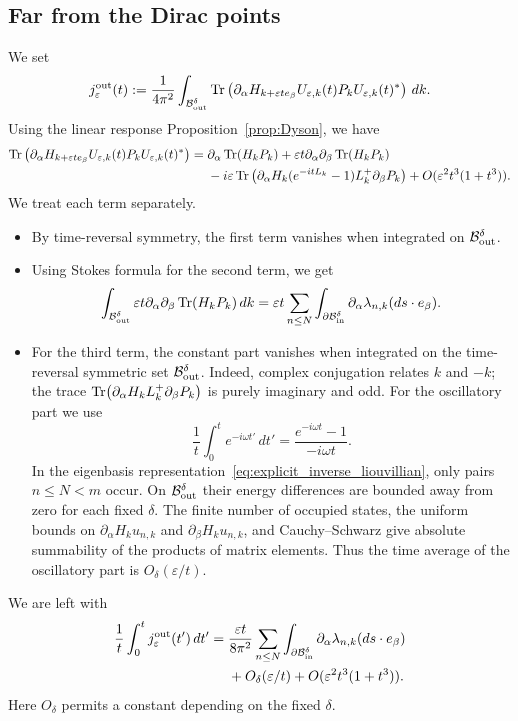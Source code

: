 \documentclass[a4paper,11pt]{article}
\theoremstyle{plain}
\theoremstyle{remark}
\def\eps{{\varepsilon}}
\begin{document}
\subsection{Far from the Dirac points}
We set
\[
j_\eps^{\rm out}(t):=
\frac1{4\pi^2}\int_{\mathcal B_{\rm out}^\delta}
\Tr\left(\partial_\alpha H_{k+\eps te_\beta}
U_{\eps,k}(t)P_k
U_{\eps,k}(t)^*\right)\,dk.
\]
Using the linear response Proposition~\ref{prop:Dyson}, we have
\begin{align*}
\Tr\left(\partial_\alpha H_{k+\eps te_\beta}
U_{\eps,k}(t)P_k
U_{\eps,k}(t)^*\right)
={}&\partial_\alpha\Tr(H_kP_k)
+\eps t\partial_\alpha\partial_\beta\Tr(H_kP_k)\\
&-i\eps\Tr\left(\partial_\alpha H_k(e^{-itL_k}-1)
L_k^+\partial_\beta P_k\right)
+O(\eps^2t^3(1+t^3)).
\end{align*}
We treat each term separately.
\begin{itemize}
\item By time-reversal symmetry, the first term vanishes when
integrated on $\mathcal B_{\rm out}^\delta$.
\item Using Stokes formula for the second term, we get
\begin{equation}\label{secondslot}
\int_{\mathcal B_{\rm out}^\delta}
\eps t\partial_\alpha\partial_\beta\Tr(H_kP_k)\,dk
=\eps t\sum_{n\le N}\int_{\partial\mathcal B_{\rm in}^\delta}
\partial_\alpha\lambda_{n,k}(ds\cdot e_\beta).
\end{equation}
\item For the third term, the constant part vanishes when integrated
on the time-reversal symmetric set $\mathcal B_{\rm out}^\delta$.
Indeed, complex conjugation relates $k$ and $-k$; the trace
$\Tr(\partial_\alpha H_kL_k^+\partial_\beta P_k)$
is purely imaginary and odd. For the oscillatory part we use
\[
\frac1t\int_0^t e^{-i\omega t'}\,dt'
=\frac{e^{-i\omega t}-1}{-i\omega t}.
\]
In the eigenbasis representation~\eqref{eq:explicit_inverse_liouvillian},
only pairs $n\le N<m$ occur. On
$\mathcal B_{\rm out}^\delta$ their energy differences are bounded
away from zero for each fixed $\delta$. The finite number of occupied
states, the uniform bounds on $\partial_\alpha H_ku_{n,k}$ and
$\partial_\beta H_ku_{n,k}$, and Cauchy--Schwarz give absolute
summability of the products of matrix elements. Thus the time average
of the oscillatory part is $O_\delta(\eps/t)$.
\end{itemize}
We are left with
\begin{align}\label{Bout}
\frac1t\int_0^t j_\eps^{\rm out}(t')\,dt'
={}&\frac{\eps t}{8\pi^2}\sum_{n\le N}
\int_{\partial\mathcal B_{\rm in}^\delta}
\partial_\alpha\lambda_{n,k}(ds\cdot e_\beta)\\
&+O_\delta(\eps/t)+O(\eps^2t^3(1+t^3)).\nonumber
\end{align}
Here $O_\delta$ permits a constant depending on the fixed $\delta$.
\end{document}
